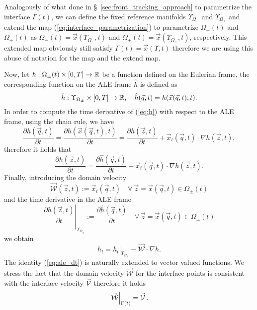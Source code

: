 Analogously of what done in \S~\ref{sec:front_tracking_approach} to parametrize
the interface $\Gamma(t)$, we can define the fixed reference manifolds
$\Upsilon_{\Omega_-}$ and $\Upsilon_{\Omega_+}$ and extend the map
(\ref{eq:interface_parametrization}) to parametrize $\Omega_-(t)$ and
$\Omega_+(t)$  as $\Omega_-(t)=\vec x(\Upsilon_{\Omega_-},t)$ and
$\Omega_+(t)=\vec x(\Upsilon_{\Omega_+},t)$, respectively. This extended map
obviously still satisfy $\Gamma(t) = \vec x(\Upsilon,t)$ therefore we are using
this abuse of notation for the map and the extend map.

Now, let $h:\Omega_{\pm}(t)\times [0,T]\to {\mathbb R}$ be a function defined on
the Eulerian frame, the corresponding function on the ALE frame $\hat h$ is
defined as
\begin{equation}\label{eq:h}
\hat h:\Upsilon_{\Omega_\pm}\times [0,T]\to {\mathbb R},\quad
\hat h(\vec q,t)=h(\vec{x}(\vec q,t),t).
\end{equation}
In order to compute the time derivative of (\ref{eq:h}) with respect to the ALE
frame, using the chain rule, we have
\begin{equation}
\frac{\partial\hat h(\vec q,t)}{\partial t}=\frac{\partial h(\vec x(\vec
q,t),t)}{\partial t}=\frac{\partial h(\vec z,t)}{\partial t}+\vec x_t(\vec q,t)
\cdot \nabla h(\vec z,t),
\end{equation}
therefore it holds that
\begin{equation}
\frac{\partial h(\vec z,t)}{\partial t} =
\frac{\partial\hat h(\vec q,t)}{\partial t}-
\vec x_t(\vec q,t) \cdot \nabla h(\vec z,t).
\end{equation}
Finally, introducing the domain velocity
\begin{equation} \label{eq:W}
\vec{\mathcal{W}}(\vec z, t) := \vec x_t(\vec q, t) \quad
\forall\ \vec z = \vec x(\vec q,t) \in \Omega_\pm(t)
\end{equation}
and the time derivative in the ALE frame
\begin{equation} \label{eq:ale_derivative}
\left.\frac{\partial h(\vec z,t)}{\partial t}\right|_{\Upsilon_{\Omega_\pm}}:=
\frac{\partial\hat h(\vec q,t)}{\partial t} \quad
\forall\ \vec z = \vec x(\vec q,t) \in \Omega_\pm(t)
\end{equation}
we obtain
\begin{equation}\label{eq:ale_dt}
h_t =\left.h_t\right|_{\Upsilon_{\Omega_\pm}} -\vec{\mathcal{W}} \cdot \nabla h.
\end{equation}
The identity (\ref{eq:ale_dt}) is naturally extended to vector valued functions.
We stress the fact that the domain velocity $\vec{\mathcal{W}}$ for the
interface points is consistent with the interface velocity $\vec{\mathcal{V}}$ therefore it
holds
\begin{equation}
\left.\vec{\mathcal{W}}\right|_{\Gamma(t)}=\vec{\mathcal{V}}\,.
\end{equation}

